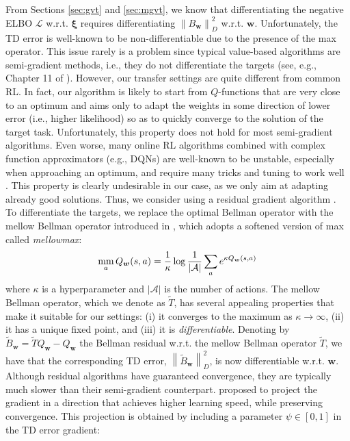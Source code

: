 \documentclass{article}
\newcommand{\mm}{\operatornamewithlimits{mm}}
\newcommand{\wt}[1]{\widetilde{#1}}
\newcommand{\norm}[1]{\left\lVert #1 \right\rVert}
\begin{document}
From Sections \ref{sec:gvt} and \ref{sec:mgvt}, we know that differentiating the negative ELBO $\mathcal{L}$ w.r.t. $\bm{\xi}$ requires differentiating $\norm{B_{\bm{w}}}_D^2$ w.r.t. $\bm{w}$. Unfortunately, the TD error is well-known to be non-differentiable due to the presence of the max operator. This issue rarely is a problem since typical value-based algorithms are semi-gradient methods, i.e., they do not differentiate the targets (see, e.g., Chapter 11 of \cite{sutton1998reinforcement}). However, our transfer settings are quite different from common RL. In fact, our algorithm is likely to start from $Q$-functions that are very close to an optimum and aims only to adapt the weights in some direction of lower error (i.e., higher likelihood) so as to quickly converge to the solution of the target task. Unfortunately, this property does not hold for most semi-gradient algorithms. Even worse, many online RL algorithms combined with complex function approximators (e.g., DQNs) are well-known to be unstable, especially when approaching an optimum, and require many tricks and tuning to work well \cite{schaul2015prioritized,van2016deep}. This property is clearly undesirable in our case, as we only aim at adapting already good solutions. Thus, we consider using a residual gradient algorithm \cite{baird1995residual}. To differentiate the targets, we replace the optimal Bellman operator with the mellow Bellman operator introduced in \cite{asadi2017alternative}, which adopts a softened version of max called \textit{mellowmax}:
\begin{equation}
\mm_a Q_{\bm{w}}(s,a) = \frac{1}{\kappa} \log \frac{1}{|\mathcal{A}|}\sum_a e^{\kappa Q_{\bm{w}}(s,a)}
\end{equation}
where $\kappa$ is a hyperparameter and $|\mathcal{A}|$ is the number of actions. The mellow Bellman operator, which we denote as $\wt{T}$, has several appealing properties that make it suitable for our settings: (i) it converges to the maximum as $\kappa \rightarrow \infty$, (ii) it has a unique fixed point, and (iii) it is \textit{differentiable}. Denoting by $\wt{B}_{\bm{w}} = \wt{T}Q_{\bm{w}} - Q_{\bm{w}}$ the Bellman residual w.r.t. the mellow Bellman operator $\wt{T}$, we have that the corresponding TD error, $\norm{\wt{B}_{\bm{w}}}_D^2$, is now differentiable w.r.t. $\bm{w}$. Although residual algorithms have guaranteed convergence, they are typically much slower than their semi-gradient counterpart. \cite{baird1995residual} proposed to project the gradient in a direction that achieves higher learning speed, while preserving convergence. This projection is obtained by including a parameter $\psi\in[0,1]$ in the TD error gradient:
\end{document}
